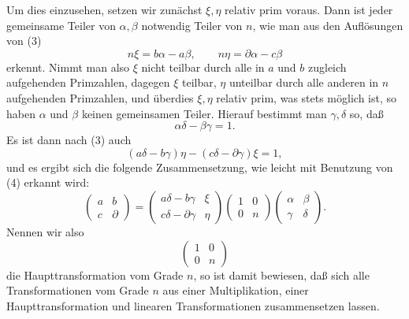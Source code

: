 \documentclass[11pt]{article}
\begin{document}
Um dies einzusehen, setzen wir zunächst $\xi,\eta$ relativ prim voraus. Dann ist jeder gemeinsame Teiler von $\alpha,\beta$ notwendig Teiler von $n$, wie man aus den Auflösungen von (3)
\begin{equation}
n\xi=b\alpha-a\beta,
\qquad
n\eta=\partial\alpha-c\beta \tag{4}
\end{equation}
erkennt. Nimmt man also $\xi$ nicht teilbar durch alle in $a$ und $b$ zugleich aufgehenden Primzahlen, dagegen $\xi$ teilbar, $\eta$ unteilbar durch alle anderen in $n$ aufgehenden Primzahlen, und überdies $\xi,\eta$ relativ prim, was stets möglich ist, so haben $\alpha$ und $\beta$ keinen gemeinsamen Teiler. Hierauf bestimmt man $\gamma,\delta$ so, daß
\[
\alpha\delta-\beta\gamma=1.
\]
Es ist dann nach (3) auch
\[
(a\delta-b\gamma)\eta-(c\delta-\partial\gamma)\xi=1,
\]
und es ergibt sich die folgende Zusammensetzung, wie leicht mit Benutzung von (4) erkannt wird:
\begin{equation}
\begin{pmatrix}a&b\\c&\partial\end{pmatrix}
=\begin{pmatrix}a\delta-b\gamma&\xi\\ c\delta-\partial\gamma&\eta\end{pmatrix}
\begin{pmatrix}1&0\\0&n\end{pmatrix}
\begin{pmatrix}\alpha&\beta\\\gamma&\delta\end{pmatrix}. \tag{5}
\end{equation}
Nennen wir also
\begin{equation}
\begin{pmatrix}1&0\\0&n\end{pmatrix} \tag{6}
\end{equation}
die Haupttransformation vom Grade $n$, so ist damit bewiesen, daß sich alle Transformationen vom Grade $n$ aus einer Multiplikation, einer Haupttransformation und linearen Transformationen zusammensetzen lassen.
\end{document}
